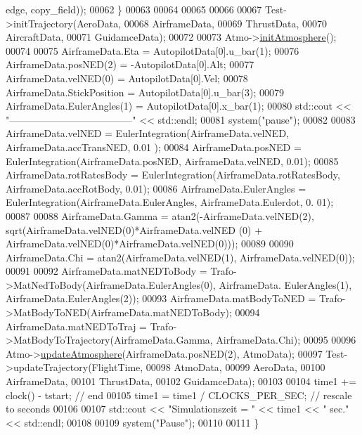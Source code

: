 \begin{DoxyCode}
      edge, copy\_field));
00062         \}
00063 
00064 
00065 
00066         
00067         Test->initTrajectory(AeroData,
00068                             AirframeData,
00069                             ThrustData,
00070                             AircraftData,
00071                             GuidamceData);
00072 
00073         Atmo->\hyperlink{group___atmosphere_a6e1d5763fbb6631784c99ee3c88911bd}{initAtmosphere}();
00074 
00075         AirframeData.Eta = AutopilotData[0].u\_bar(1);
00076         AirframeData.posNED(2) = -AutopilotData[0].Alt;
00077         AirframeData.velNED(0) = AutopilotData[0].Vel;
00078         AirframeData.StickPosition = AutopilotData[0].u\_bar(3);
00079         AirframeData.EulerAngles(1) = AutopilotData[0].x\_bar(1);
00080         std::cout << \textcolor{stringliteral}{"--------------------------------------"} << std::endl;
00081         system(\textcolor{stringliteral}{"pause"});
00082 
00083         AirframeData.velNED          = EulerIntegration(AirframeData.velNED, AirframeData.accTransNED, 0.01
      );
00084         AirframeData.posNED          = EulerIntegration(AirframeData.posNED, AirframeData.velNED, 0.01);
00085         AirframeData.rotRatesBody    = EulerIntegration(AirframeData.rotRatesBody, AirframeData.accRotBody,
      0.01);
00086         AirframeData.EulerAngles     = EulerIntegration(AirframeData.EulerAngles, AirframeData.Eulerdot, 0.
      01);
00087 
00088         AirframeData.Gamma = atan2(-AirframeData.velNED(2), sqrt(AirframeData.velNED(0)*AirframeData.velNED
      (0) + AirframeData.velNED(0)*AirframeData.velNED(0)));
00089 
00090         AirframeData.Chi = atan2(AirframeData.velNED(1), AirframeData.velNED(0));
00091 
00092         AirframeData.matNEDToBody = Trafo->MatNedToBody(AirframeData.EulerAngles(0), AirframeData.
      EulerAngles(1), AirframeData.EulerAngles(2));
00093         AirframeData.matBodyToNED = Trafo->MatBodyToNED(AirframeData.matNEDToBody);
00094         AirframeData.matNEDToTraj = Trafo->MatBodyToTrajectory(AirframeData.Gamma, AirframeData.Chi);
00095 
00096         Atmo->\hyperlink{group___atmosphere_a2bd97471d32725d6196ee6816ea36c99}{updateAtmosphere}(AirframeData.posNED(2), AtmoData);
00097         Test->updateTrajectory(FlightTime,
00098                                 AtmoData,
00099                                 AeroData,
00100                                 AirframeData,
00101                                 ThrustData,
00102                                 GuidamceData);
00103 
00104     time1 += clock() - tstart;     \textcolor{comment}{// end}
00105     time1 = time1 / CLOCKS\_PER\_SEC;  \textcolor{comment}{// rescale to seconds}
00106 
00107     std::cout << \textcolor{stringliteral}{"Simulationszeit = "} << time1 << \textcolor{stringliteral}{" sec."} << std::endl;
00108 
00109     system(\textcolor{stringliteral}{"Pause"});
00110 
00111 \}
\end{DoxyCode}
